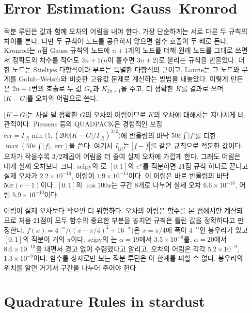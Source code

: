 \section{Error Estimation: Gauss--Kronrod}
\label{sec:kronrod}

적분 루틴은 값과 함께 오차의 어림을 내야 한다. 가장 단순하게는 서로 다른 두 규칙의 차이를 본다. 다만 두 규칙이 노드를 공유하지 않으면 함수 호출이 두 배로 든다. Kronrod는 $n$점 Gauss 규칙의 노드에 $n+1$개의 노드를 더해 원래 노드를 그대로 쓰면서 정확도의 차수를 적어도 $3n+1$($n$이 홀수면 $3n+2$)로 올리는 규칙을 만들었다\cite{kronrod1965}. 더한 노드는 Stieltjes 다항식이라 부르는 특별한 다항식의 근이고, Laurie는 그 노드와 무게를 Golub--Welsch와 비슷한 고유값 문제로 계산하는 방법을 내놓았다\cite{laurie1997kronrod}. 이렇게 만든 은 $2n+1$번의 호출로 두 값 $G_n$과 $K_{2n+1}$을 주고, 더 정확한 $K$를 결과로 쓰며 $|K-G|$를 오차의 어림으로 쓴다.

$|K-G|$는 사실 덜 정확한 $G$의 오차의 어림이므로 $K$의 오차에 대해서는 지나치게 비관적이다. Piessens 등의 QUADPACK은 경험적인 보정 $\mathrm{err}=I_{|f|}\min\bigl(1,(200|K-G|/I_{|f|})^{3/2}\bigr)$에 반올림의 바닥 $50\varepsilon\int|f|$를 더한 $\max(50\varepsilon\int|f|,\ \mathrm{err})$을 쓴다\cite{piessens1983quadpack}. 여기서 $I_{|f|}$는 $|f-\bar f|$를 같은 규칙으로 적분한 값이다. 오차가 작을수록 $3/2$제곱이 어림을 더 줄여 실제 오차에 가깝게 한다. 그래도 어림은 대개 실제 오차보다 크다. scipy의 로 $[0,1]$의 $e^x$를 적분하면 21점 규칙 하나로 끝나고 실제 오차가 $2.2\times10^{-16}$, 어림이 $1.9\times10^{-14}$이다. 이 어림은 바로 반올림의 바닥 $50\varepsilon(e-1)$이다. $[0,1]$의 $\cos100x$는 구간 $8$개로 나누어 실제 오차 $6.6\times10^{-16}$, 어림 $5.9\times10^{-10}$이다.

어림이 실제 오차보다 작으면 더 위험하다. 오차의 어림은 함수를 본 점에서만 계산되므로 처음 21점이 모두 함수의 중요한 부분을 놓치면 규칙은 틀린 값을 정확하다고 판정한다. $f(x)=4^{-\alpha}/\bigl((x-\pi/4)^2+16^{-\alpha}\bigr)$은 $x=\pi/4$에 폭이 $4^{-\alpha}$인 봉우리가 있고 $[0,1]$의 적분이 거의 $\pi$이다. scipy의 는 $\alpha=19$에서 $3.5\times10^{-9}$를, $\alpha=20$에서 $8.6\times10^{-10}$을 내면서 경고 없이 수렴했다고 알리고, 오차의 어림은 각각 $5.2\times10^{-9}$, $1.3\times10^{-9}$이다. 함수를 상자로만 보는 적분 루틴은 이 한계를 피할 수 없다. 봉우리의 위치를 알면 거기서 구간을 나누어 주어야 한다.

\section{Quadrature Rules in stardust}
\label{sec:quadrature-stardust}

